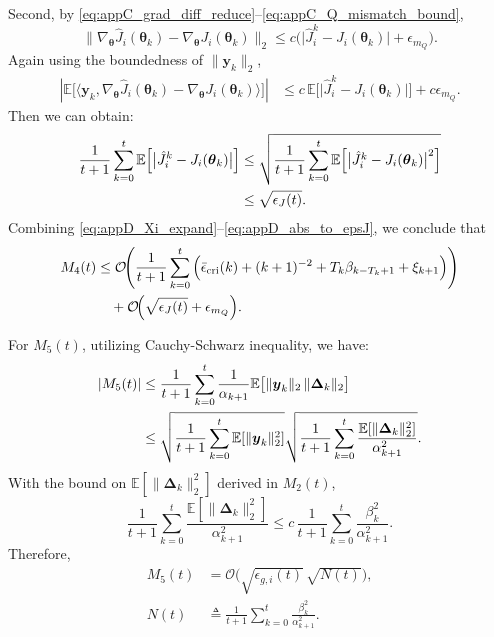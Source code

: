 \documentclass{IEEEtran}
\begin{document}
Second, by \eqref{eq:appC_grad_diff_reduce}--\eqref{eq:appC_Q_mismatch_bound},
\begin{equation}
\big\|\nabla_{\boldsymbol{\theta}}\hat{J}_i(\boldsymbol{\theta}_k)-\nabla_{\boldsymbol{\theta}}J_i(\boldsymbol{\theta}_k)\big\|_2
\le c\Big(\big|\hat{J}_i^k-J_i(\boldsymbol{\theta}_k)\big|+\epsilon_{m_Q}\Big).
\label{eq:appD_gradgap}
\end{equation}
Again using the boundedness of $\|\boldsymbol{y}_k\|_2$,
\begin{align}
\left|\mathbb{E}\Big[\big\langle \boldsymbol{y}_k,\nabla_{\boldsymbol{\theta}}\hat{J}_i(\boldsymbol{\theta}_k)-\nabla_{\boldsymbol{\theta}}J_i(\boldsymbol{\theta}_k)\big\rangle\Big]\right|
&\le c\,\mathbb{E}\Big[\big|\hat{J}_i^k-J_i(\boldsymbol{\theta}_k)\big|\Big]+c\epsilon_{m_Q}.
\label{eq:appD_Xi_second_pre}
\end{align}
Then we can obtain: 
\begin{align}
\frac{1}{t+1}\sum_{k=0}^{t}\mathbb{E}\Big[\big|\hat{J}_i^k-J_i(\boldsymbol{\theta}_k)\big|\Big]
&\le \sqrt{\frac{1}{t+1}\sum_{k=0}^{t}\mathbb{E}\Big[\big|\hat{J}_i^k-J_i(\boldsymbol{\theta}_k)\big|^2\Big]} \notag\\
&\le \sqrt{\epsilon_J(t)}. 
\label{eq:appD_abs_to_epsJ}
\end{align}
Combining \eqref{eq:appD_Xi_expand}--\eqref{eq:appD_abs_to_epsJ}, we conclude that
\begin{align}
M_4(t)
&\le \mathcal{O}\!\Bigg(\frac{1}{t+1}\sum_{k=0}^{t}\Big(\bar{\epsilon}_{\mathrm{cri}}(k)+(k+1)^{-2}+T_k\beta_{k-T_k+1}+\xi_{k+1}\Big)\Bigg) \notag\\
&\quad +\mathcal{O}\!\Big(\sqrt{\epsilon_J(t)}+\epsilon_{m_Q}\Big).
\label{eq:appD_M4_bound}
\end{align}

For $M_5(t)$, utilizing Cauchy-Schwarz inequality, we have: 
\begin{align}
|M_5(t)|
&\le \frac{1}{t+1}\sum_{k=0}^{t}\frac{1}{\alpha_{k+1}}\mathbb{E}\big[\|\boldsymbol{y}_k\|_2\,\|\boldsymbol{\Delta}_k\|_2\big] \notag\\
&\le \sqrt{\frac{1}{t+1}\sum_{k=0}^{t}\mathbb{E}[\|\boldsymbol{y}_k\|_2^2]}
\sqrt{\frac{1}{t+1}\sum_{k=0}^{t}\frac{\mathbb{E}[\|\boldsymbol{\Delta}_k\|_2^2]}{\alpha_{k+1}^2}}.
\label{eq:appD_M5_pre}
\end{align}
With the bound on $\mathbb{E}[\|\boldsymbol{\Delta}_k\|_2^2]$ derived in $M_2(t)$, 
\begin{equation}
\frac{1}{t+1}\sum_{k=0}^{t}\frac{\mathbb{E}[\|\boldsymbol{\Delta}_k\|_2^2]}{\alpha_{k+1}^2}
\le c\,\frac{1}{t+1}\sum_{k=0}^{t}\frac{\beta_k^2}{\alpha_{k+1}^2}.
\end{equation}
Therefore,
\begin{equation}
\begin{aligned}
M_5(t)
&=\mathcal{O}\!\Big(\sqrt{\epsilon_{g,i}(t)}\,\sqrt{N(t)}\Big),\\
N(t)
&\triangleq \frac{1}{t+1}\sum_{k=0}^{t}\frac{\beta_k^2}{\alpha_{k+1}^2}.
\end{aligned}
\label{eq:appD_M5_bound}
\end{equation}
\end{document}
